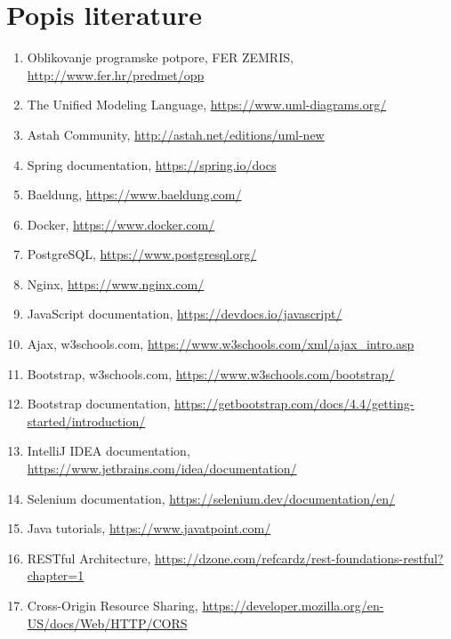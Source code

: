 \chapter*{Popis literature}
		
		\begin{enumerate}
			
			
			\item  Oblikovanje programske potpore, FER ZEMRIS, \url{http://www.fer.hr/predmet/opp}

			\item  The Unified Modeling Language, \url{https://www.uml-diagrams.org/}
			
			\item  Astah Community, \url{http://astah.net/editions/uml-new}
			
			\item  Spring documentation, \url{https://spring.io/docs}
			
			\item  Baeldung, \url{https://www.baeldung.com/}
			
			\item  Docker, \url{https://www.docker.com/}
			
			\item  PostgreSQL, \url{https://www.postgresql.org/}
			
			\item  Nginx, \url{https://www.nginx.com/}
			
			\item  JavaScript documentation, \url{https://devdocs.io/javascript/}
			
			\item  Ajax, w3schools.com, \url{https://www.w3schools.com/xml/ajax_intro.asp}
			
			\item  Bootstrap, w3schools.com, \url{https://www.w3schools.com/bootstrap/}
			
			\item  Bootstrap documentation, \url{https://getbootstrap.com/docs/4.4/getting-started/introduction/}			
			
			\item  IntelliJ IDEA documentation, \url{https://www.jetbrains.com/idea/documentation/}
			
			\item  Selenium documentation, \url{https://selenium.dev/documentation/en/}
			
			\item  Java tutorials, \url{https://www.javatpoint.com/}

			\item  RESTful Architecture, \url{https://dzone.com/refcardz/rest-foundations-restful?chapter=1}
			
			\item  Cross-Origin Resource Sharing, \url{https://developer.mozilla.org/en-US/docs/Web/HTTP/CORS}
			
		\end{enumerate}
		
		 